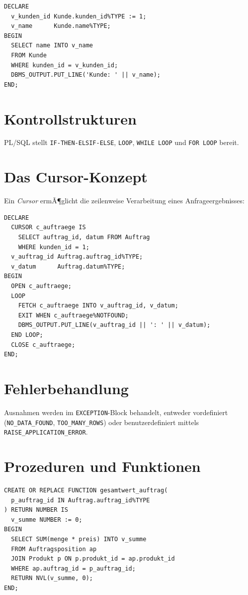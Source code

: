 ﻿\documentclass[a4paper,12pt]{report}
\theoremstyle{definition}
\theoremstyle{remark}
\begin{document}
\begin{lstlisting}
DECLARE
  v_kunden_id Kunde.kunden_id%TYPE := 1;
  v_name      Kunde.name%TYPE;
BEGIN
  SELECT name INTO v_name
  FROM Kunde
  WHERE kunden_id = v_kunden_id;
  DBMS_OUTPUT.PUT_LINE('Kunde: ' || v_name);
END;
\end{lstlisting}

\section{Kontrollstrukturen}

PL/SQL stellt \texttt{IF-THEN-ELSIF-ELSE}, \texttt{LOOP},
\texttt{WHILE LOOP} und \texttt{FOR LOOP} bereit.

\section{Das Cursor-Konzept}

Ein \emph{Cursor} ermÃ¶glicht die zeilenweise Verarbeitung eines
Anfrageergebnisses:

\begin{lstlisting}
DECLARE
  CURSOR c_auftraege IS
    SELECT auftrag_id, datum FROM Auftrag
    WHERE kunden_id = 1;
  v_auftrag_id Auftrag.auftrag_id%TYPE;
  v_datum      Auftrag.datum%TYPE;
BEGIN
  OPEN c_auftraege;
  LOOP
    FETCH c_auftraege INTO v_auftrag_id, v_datum;
    EXIT WHEN c_auftraege%NOTFOUND;
    DBMS_OUTPUT.PUT_LINE(v_auftrag_id || ': ' || v_datum);
  END LOOP;
  CLOSE c_auftraege;
END;
\end{lstlisting}

\section{Fehlerbehandlung}

Ausnahmen werden im \texttt{EXCEPTION}-Block behandelt, entweder
vordefiniert (\texttt{NO\_DATA\_FOUND}, \texttt{TOO\_MANY\_ROWS}) oder
benutzerdefiniert mittels \texttt{RAISE\_APPLICATION\_ERROR}.

\section{Prozeduren und Funktionen}

\begin{lstlisting}
CREATE OR REPLACE FUNCTION gesamtwert_auftrag(
  p_auftrag_id IN Auftrag.auftrag_id%TYPE
) RETURN NUMBER IS
  v_summe NUMBER := 0;
BEGIN
  SELECT SUM(menge * preis) INTO v_summe
  FROM Auftragsposition ap
  JOIN Produkt p ON p.produkt_id = ap.produkt_id
  WHERE ap.auftrag_id = p_auftrag_id;
  RETURN NVL(v_summe, 0);
END;
\end{lstlisting}
\end{document}
